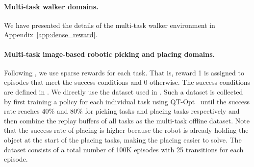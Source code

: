 \paragraph{Multi-task walker domains.} We have presented the details of the multi-task walker environment in Appendix~\ref{app:dense_reward}.

\paragraph{Multi-task image-based robotic picking and placing domains.} Following \cite{kalashnikov2021mt,yu2021conservative}, we use sparse rewards for each task. That is, reward 1 is assigned to episodes that meet the success conditions and 0 otherwise. The success conditions are defined in \citep{kalashnikov2021mt}. 
We directly use the dataset used in \cite{yu2021conservative}. Such a dataset is collected by first training a policy for each individual task using QT-Opt~\citep{kalashnikov2018scalable} until the success rate reaches 40\% and 80\% for picking tasks and placing tasks respectively and then combine the replay buffers of all tasks as the multi-task offline dataset. Note that the success rate of placing is higher because the robot is already holding the object at the start of the placing tasks, making the placing easier to solve. The dataset consists of a total number of 100K episodes with 25 transitions for each episode. 









